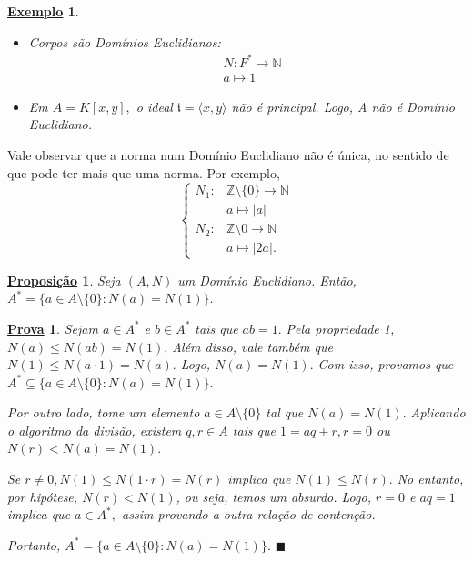 \documentclass{article}
\newtheorem*{prop*}{\underline{Proposi\c c\~ao}}
\newtheorem{example}{\underline{Exemplo}}
\newtheorem*{proof*}{\underline{Prova}}
\renewcommand\qedsymbol{$\blacksquare$}
\begin{document}
    \begin{example}
      \begin{itemize}
        \item[1)] Corpos são Domínios Euclidianos:
          \begin{align*}
    &N:F^{*}\rightarrow \mathbb{N}\\
    &a\mapsto 1
          \end{align*}
        \item[2)] Em \(A = K[x, y],\) o ideal \(\mathfrak{i} = \langle x, y \rangle\) não é principal. Logo, A não é Domínio Euclidiano.
      \end{itemize}
    \end{example}
    Vale observar que a norma num Domínio Euclidiano não é única, no sentido de que pode ter mais que uma norma. Por exemplo,
    \[
      \left\{\begin{array}{ll}
          N_{1}:&\mathbb{Z}\setminus{\{0\}}\rightarrow \mathbb{N}\\
                &a\mapsto |a|\\
          N_{2}:&\mathbb{Z}\setminus{0}\rightarrow \mathbb{N}\\
                &a\mapsto |2a|.
      \end{array}\right.
    \]
    \begin{prop*}
      Seja \((A, N)\) um Domínio Euclidiano. Então, \(A^{*}=\{a\in A\setminus{\{0\}}: N(a) = N(1)\}.\)
    \end{prop*}
    \begin{proof*}
      Sejam \(a\in A^{*}\) e \(b\in A^{*}\) tais que \(ab = 1.\) Pela propriedade 1,
      \(N(a)\leq N(ab) = N(1).\) Além disso, vale também que \(N(1)\leq N(a \cdot 1) = N(a).\) Logo,
      \(N(a) = N(1).\) Com isso, provamos que \(A^{*}\subseteq{\{a\in A\setminus{\{0\}}: N(a) = N(1)\}}.\)

      Por outro lado, tome um elemento \(a\in A\setminus{\{0\}}\) tal que \(N(a) = N(1).\) Aplicando o algoritmo da divisão,
      existem \(q, r\in A\) tais que \(1 = aq + r, r = 0\) ou \(N(r) < N(a) = N(1).\)

      Se \(r\neq0, N(1)\leq N(1 \cdot r) = N(r)\) implica que \(N(1)\leq N(r).\) No entanto, por hipótese,
      \(N(r) < N(1)\), ou seja, temos um absurdo. Logo, \(r = 0\) e \(aq = 1\) implica que \(a\in A^{*},\) assim provando
      a outra relação de contenção.

      Portanto, \(A^{*}=\{a\in A\setminus{\{0\}}: N(a) = N(1)\}.\) \qedsymbol
    \end{proof*}
\end{document}
